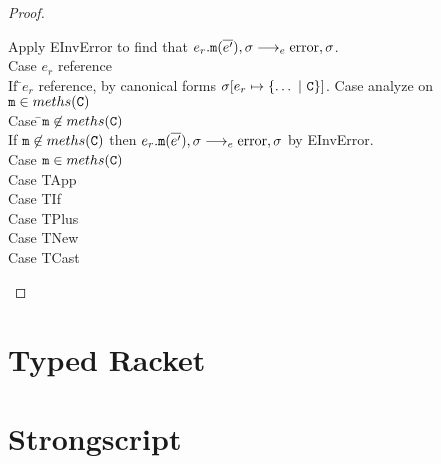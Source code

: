 \documentclass{report}
\begin{document}
\begin{proof}
\begin{tabbing}
\> \> \> Apply EInvError to find that $e_r.\texttt{m}(\overline{ e'} ),\sigma \longrightarrow_{e} \text{error},\sigma$.\\
\> \> Case $e_r$ reference \\
\> \> \> If \=$e_r$ reference, by canonical forms $\sigma[e_r \mapsto \{\ldots ~|~ \texttt{C} \}]$. Case analyze on $\texttt{m} \in meths(\texttt{C})$\\
\> \> \> \> Case \=$\texttt{m} \not\in meths(\texttt{C})$ \\
\> \> \> \> \> If $\texttt{m} \not\in meths(\texttt{C})$ then $e_r.\texttt{m}(\overline{ e'} ),\sigma \longrightarrow_{e} \text{error},\sigma$ by EInvError.\\
\> \> \> \> Case $\texttt{m} \in meths(\texttt{C})$ \\
Case TApp\\
Case TIf\\
Case TPlus\\
Case TNew\\
Case TCast\\
\end{tabbing}
\end{proof}
\section{Typed Racket}
\section{Strongscript}
\end{document}
